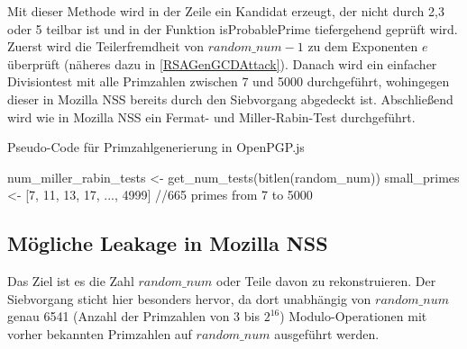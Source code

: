 Mit dieser Methode wird in der Zeile ein Kandidat erzeugt, der nicht durch 2,3 oder 5 teilbar ist und in der Funktion isProbablePrime tiefergehend geprüft wird.
Zuerst wird die Teilerfremdheit von $random\_num -1$ zu dem Exponenten $e$ überprüft (näheres dazu in \ref{RSAGenGCDAttack}).
Danach wird ein einfacher Divisiontest mit alle Primzahlen zwischen 7 und 5000 durchgeführt, wohingegen dieser in Mozilla NSS bereits durch den Siebvorgang abgedeckt ist.
Abschließend wird wie in Mozilla NSS ein Fermat- und Miller-Rabin-Test durchgeführt.

\begin{algorithm}[h]
\DontPrintSemicolon
\caption{Pseudo-Code für Primzahlgenerierung in OpenPGP.js}
\label{alg:randomProbablePrimeOpenPGPjs}
num_miller_rabin_tests <- get_num_tests(bitlen(random\_num))\;
small\_primes <- [7, 11, 13, 17, ..., 4999] //665 primes from 7 to 5000\;


\end{algorithm}

\subsection{Mögliche Leakage in Mozilla NSS}
\label{leakageMozillaNSS}

Das Ziel ist es die Zahl $random\_num$ oder Teile davon zu rekonstruieren.
Der Siebvorgang sticht hier besonders hervor, da dort unabhängig von $random\_num$ genau 6541 (Anzahl der Primzahlen von 3 bis $2^{16}$) Modulo-Operationen mit vorher bekannten Primzahlen auf $random\_num$ ausgeführt werden.

